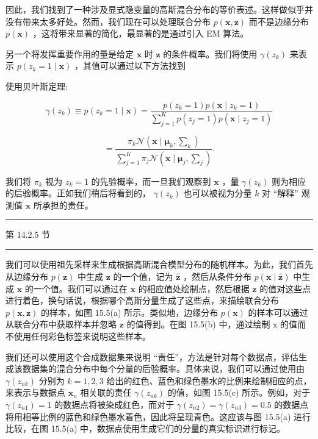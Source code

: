 \documentclass[10pt]{article}
\newcommand{\HRule}{\begin{center}\rule{0.9\linewidth}{0.2mm}\end{center}}
\begin{document}
因此，我们找到了一种涉及显式隐变量的高斯混合分布的等价表述。这样做似乎并没有带来太多好处。然而，我们现在可以处理联合分布 \(p\left( {\mathbf{x},\mathbf{z}}\right)\) 而不是边缘分布 \(p\left( \mathbf{x}\right)\) ，这将带来显著的简化，最显著的是通过引入 EM 算法。

另一个将发挥重要作用的量是给定 \(\mathbf{x}\) 时 \(\mathbf{z}\) 的条件概率。我们将使用 \(\gamma \left( {z}_{k}\right)\) 来表示 \(p\left( {{z}_{k} = 1 \mid  \mathbf{x}}\right)\) ，其值可以通过以下方法找到

使用贝叶斯定理:

\[
\gamma \left( {z}_{k}\right)  \equiv  p\left( {{z}_{k} = 1 \mid  \mathbf{x}}\right)  = \frac{p\left( {{z}_{k} = 1}\right) p\left( {\mathbf{x} \mid  {z}_{k} = 1}\right) }{\mathop{\sum }\limits_{{j = 1}}^{K}p\left( {{z}_{j} = 1}\right) p\left( {\mathbf{x} \mid  {z}_{j} = 1}\right) }
\]

\[
= \frac{{\pi }_{k}\mathcal{N}\left( {\mathbf{x} \mid  {\mathbf{\mu }}_{k},{\mathbf{\sum }}_{k}}\right) }{\mathop{\sum }\limits_{{j = 1}}^{K}{\pi }_{j}\mathcal{N}\left( {\mathbf{x} \mid  {\mathbf{\mu }}_{j},{\mathbf{\sum }}_{j}}\right) }. \tag{15.12}
\]

我们将 \({\pi }_{k}\) 视为 \({z}_{k} = 1\) 的先验概率，而一旦我们观察到 \(\mathbf{x}\) ，量 \(\gamma \left( {z}_{k}\right)\) 则为相应的后验概率。正如我们稍后将看到的， \(\gamma \left( {z}_{k}\right)\) 也可以被视为分量 \(k\) 对 “解释” 观测值 \(\mathbf{x}\) 所承担的责任。

\HRule

第 14.2.5 节

\HRule

我们可以使用祖先采样来生成根据高斯混合模型分布的随机样本。为此，我们首先从边缘分布 \(p\left( \mathbf{z}\right)\) 中生成 \(\mathbf{z}\) 的一个值，记为 \(\widehat{\mathbf{z}}\) ，然后从条件分布 \(p\left( {\mathbf{x} \mid  \widehat{\mathbf{z}}}\right)\) 中生成 \(\mathbf{x}\) 的一个值。我们可以通过在 \(\mathbf{x}\) 的相应值处绘制点，然后根据 \(\mathbf{z}\) 的值对这些点进行着色，换句话说，根据哪个高斯分量生成了这些点，来描绘联合分布 \(p\left( {\mathbf{x},\mathbf{z}}\right)\) 的样本，如图 15.5(a) 所示。类似地，边缘分布 \(p\left( \mathbf{x}\right)\) 的样本可以通过从联合分布中获取样本并忽略 \(\mathbf{z}\) 的值得到。在图 15.5(b) 中，通过绘制 \(\mathrm{x}\) 的值而不使用任何彩色标签来说明这些样本。

我们还可以使用这个合成数据集来说明 “责任”，方法是针对每个数据点，评估生成该数据集的混合分布中每个分量的后验概率。具体来说，我们可以通过使用由 \(\gamma \left( {z}_{nk}\right)\) 分别为 \(k = 1,2,3\) 给出的红色、蓝色和绿色墨水的比例来绘制相应的点，来表示与数据点 \({\mathbf{x}}_{n}\) 相关联的责任 \(\gamma \left( {z}_{nk}\right)\) 的值，如图 15.5(c) 所示。例如，对于 \(\gamma \left( {z}_{n1}\right)  = 1\) 的数据点将被染成红色，而对于 \(\gamma \left( {z}_{n2}\right)  = \gamma \left( {z}_{n3}\right)  = {0.5}\) 的数据点将用相等比例的蓝色和绿色墨水着色，因此将呈现青色。这应该与图 15.5(a) 进行比较，在图 15.5(a) 中，数据点使用生成它们的分量的真实标识进行标记。
\end{document}

